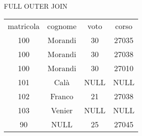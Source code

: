 \begin{frame}{FULL OUTER JOIN}
\begin{table}[h]
\centering
\begin{tabular}{|c|c|c|c|}
\hline
\rowcolor{cyan!30} \multicolumn{4}{|c|}{Result} \\
\hline
\rowcolor{cyan!30} matricola & cognome & voto & corso \\
\hline
100 & Morandi & 30 & 27035 \\
100 & Morandi & 30 & 27038 \\
100 & Morandi & 30 & 27010 \\
101 & Cal\`a & NULL & NULL \\
102 & Franco & 21 & 27038 \\
103 & Venier & NULL & NULL \\
90 & NULL & 25 & 27045 \\
\hline
\end{tabular}
\end{table}
\end{frame}